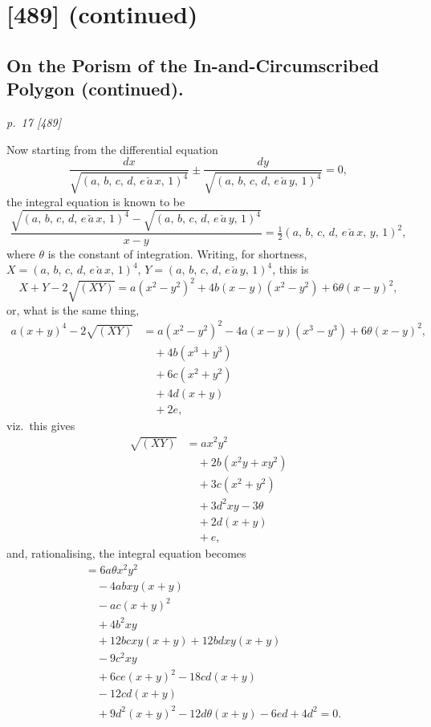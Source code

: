 ﻿\documentclass[11pt,a4paper]{article}
\theoremstyle{plain}
\theoremstyle{definition}
\begin{document}
\section*{[489] \textnormal{(continued)}}
\subsection*{On the Porism of the In-and-Circumscribed Polygon (continued).}

\bigskip
\textit{p.~17 [489]}
\smallskip

Now starting from the differential equation
\[
\frac{dx}{\sqrt{(a,\,b,\,c,\,d,\,e\,\check{a}\,x,\,1)^4}} \pm \frac{dy}{\sqrt{(a,\,b,\,c,\,d,\,e\,\check{a}\,y,\,1)^4}} = 0,
\]
the integral equation is known to be
\[
\frac{\sqrt{(a,\,b,\,c,\,d,\,e\,\check{a}\,x,\,1)^4} - \sqrt{(a,\,b,\,c,\,d,\,e\,\check{a}\,y,\,1)^4}}{x-y} = \tfrac{1}{2}(a,\,b,\,c,\,d,\,e\,\check{a}\,x,\,y,\,1)^2,
\]
where $\theta$ is the constant of integration. Writing, for shortness, $X=(a,\,b,\,c,\,d,\,e\,\check{a}\,x,\,1)^4$,
$Y=(a,\,b,\,c,\,d,\,e\,\check{a}\,y,\,1)^4$, this is
\[
X+Y-2\sqrt{(XY)}=a(x^2-y^2)^2+4b(x-y)(x^2-y^2)+6\theta(x-y)^2,
\]
or, what is the same thing,
\begin{align*}
a(x+y)^4 - 2\sqrt{(XY)} &= a(x^2-y^2)^2 - 4a(x-y)(x^3-y^3) + 6\theta(x-y)^2,\\
&\quad + 4b(x^3+y^3)\\
&\quad + 6c(x^2+y^2)\\
&\quad + 4d(x+y)\\
&\quad + 2e,
\end{align*}
viz.\ this gives
\begin{align*}
\sqrt{(XY)} &= ax^2y^2 \\
&\quad + 2b(x^2y+xy^2)\\
&\quad + 3c(x^2+y^2)\\
&\quad + 3d^2xy - 3\theta\\
&\quad + 2d(x+y)\\
&\quad + e,
\end{align*}
and, rationalising, the integral equation becomes
\begin{align*}
&= 6a\theta x^2y^2\\
&\quad - 4ab xy(x+y)\\
&\quad - ac(x+y)^2\\
&\quad + 4b^2 xy\\
&\quad + 12bc xy(x+y) + 12bd xy(x+y)\\
&\quad - 9c^2 xy\\
&\quad + 6ce(x+y)^2 - 18cd(x+y)\\
&\quad - 12cd(x+y)\\
&\quad + 9d^2(x+y)^2 - 12d\theta(x+y) - 6ed + 4d^2 = 0.
\end{align*}
\end{document}
